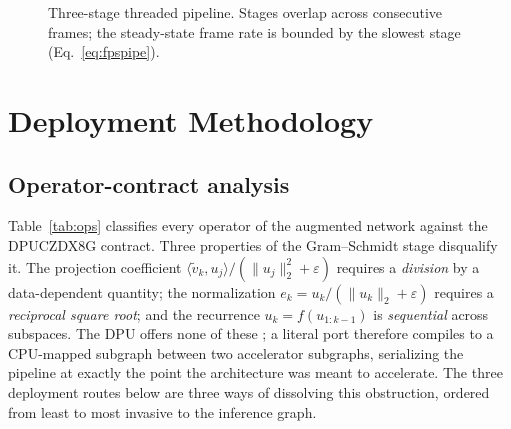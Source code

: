 \documentclass[onecolumn,journal]{IEEEtran}
\begin{document}
\begin{figure}[t]
\centering
{}
\caption{Three-stage threaded pipeline. Stages overlap across consecutive frames; the
steady-state frame rate is bounded by the slowest stage
(Eq.~\eqref{eq:fpspipe}).}
\label{fig:pipeline}
\end{figure}

\section{Deployment Methodology}\label{sec:method}

\subsection{Operator-contract analysis}\label{sec:compat}
Table~\ref{tab:ops} classifies every operator of the augmented network against the
DPUCZDX8G contract. Three properties of the Gram--Schmidt stage disqualify it. The
projection coefficient $\langle \tilde v_k, u_j\rangle / (\lVert u_j\rVert_2^2 +
\varepsilon)$ requires a \emph{division} by a data-dependent quantity; the normalization
$e_k = u_k / (\lVert u_k\rVert_2 + \varepsilon)$ requires a \emph{reciprocal square
root}; and the recurrence $u_k = f(u_{1:k-1})$ is \emph{sequential} across subspaces.
The DPU offers none of these \cite{amd_pg338}; a literal port therefore compiles to a
CPU-mapped subgraph between two accelerator subgraphs, serializing the pipeline at
exactly the point the architecture was meant to accelerate. The three deployment routes
below are three ways of dissolving this obstruction, ordered from least to most
invasive to the inference graph.
\end{document}
